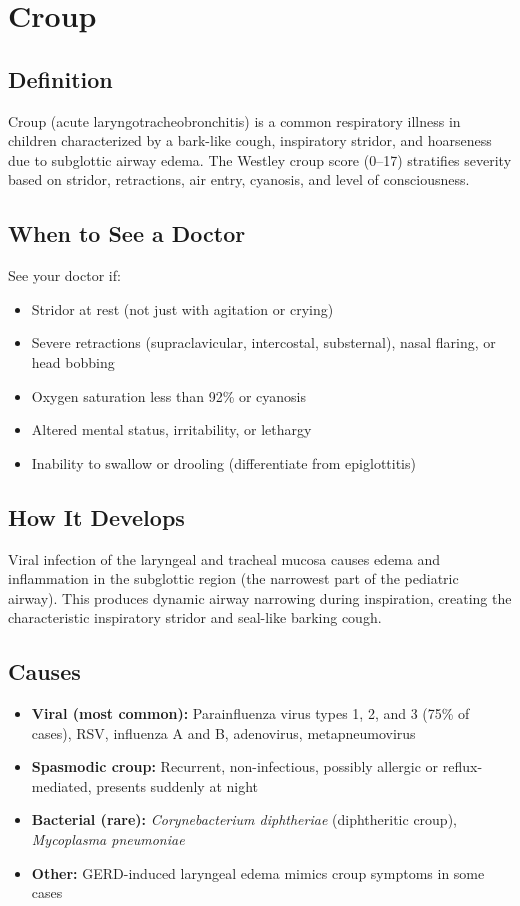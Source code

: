 \chapter{Croup}

\section*{Definition}
Croup (acute laryngotracheobronchitis) is a common respiratory illness in children characterized by a bark-like cough, inspiratory stridor, and hoarseness due to subglottic airway edema. The Westley croup score (0--17) stratifies severity based on stridor, retractions, air entry, cyanosis, and level of consciousness.

\section*{When to See a Doctor}
See your doctor if:
\begin{itemize}
  \item Stridor at rest (not just with agitation or crying)
  \item Severe retractions (supraclavicular, intercostal, substernal), nasal flaring, or head bobbing
  \item Oxygen saturation less than 92\% or cyanosis
  \item Altered mental status, irritability, or lethargy
  \item Inability to swallow or drooling (differentiate from epiglottitis)
\end{itemize}

\section*{How It Develops}
Viral infection of the laryngeal and tracheal mucosa causes edema and inflammation in the subglottic region (the narrowest part of the pediatric airway). This produces dynamic airway narrowing during inspiration, creating the characteristic inspiratory stridor and seal-like barking cough.

\section*{Causes}
\begin{itemize}
  \item \textbf{Viral (most common):} Parainfluenza virus types 1, 2, and 3 (75\% of cases), RSV, influenza A and B, adenovirus, metapneumovirus
  \item \textbf{Spasmodic croup:} Recurrent, non-infectious, possibly allergic or reflux-mediated, presents suddenly at night
  \item \textbf{Bacterial (rare):} \textit{Corynebacterium diphtheriae} (diphtheritic croup), \textit{Mycoplasma pneumoniae}
  \item \textbf{Other:} GERD-induced laryngeal edema mimics croup symptoms in some cases
\end{itemize}

